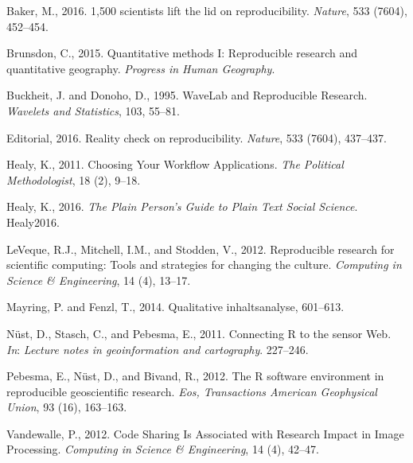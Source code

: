 \documentclass[]{article}
\begin{document}
\hypertarget{refs}{}
\hypertarget{ref-Baker2016}{}
Baker, M., 2016. 1,500 scientists lift the lid on reproducibility.
\emph{Nature}, 533 (7604), 452--454.

\hypertarget{ref-Brunsdon2015}{}
Brunsdon, C., 2015. Quantitative methods I: Reproducible research and
quantitative geography. \emph{Progress in Human Geography}.

\hypertarget{ref-Buckheit1995}{}
Buckheit, J. and Donoho, D., 1995. WaveLab and Reproducible Research.
\emph{Wavelets and Statistics}, 103, 55--81.

\hypertarget{ref-Nature2016}{}
Editorial, 2016. Reality check on reproducibility. \emph{Nature}, 533
(7604), 437--437.

\hypertarget{ref-Healy2011}{}
Healy, K., 2011. Choosing Your Workflow Applications. \emph{The
Political Methodologist}, 18 (2), 9--18.

\hypertarget{ref-Healy2016}{}
Healy, K., 2016. \emph{The Plain Person's Guide to Plain Text Social
Science}. Healy2016.

\hypertarget{ref-Leveque2012}{}
LeVeque, R.J., Mitchell, I.M., and Stodden, V., 2012. Reproducible
research for scientific computing: Tools and strategies for changing the
culture. \emph{Computing in Science \& Engineering}, 14 (4), 13--17.

\hypertarget{ref-Mayring2010}{}
Mayring, P. and Fenzl, T., 2014. Qualitative inhaltsanalyse, 601--613.

\hypertarget{ref-Nuest2011}{}
Nüst, D., Stasch, C., and Pebesma, E., 2011. Connecting R to the sensor
Web. \emph{In}: \emph{Lecture notes in geoinformation and cartography}.
227--246.

\hypertarget{ref-Pebesma2012}{}
Pebesma, E., Nüst, D., and Bivand, R., 2012. The R software environment
in reproducible geoscientific research. \emph{Eos, Transactions American
Geophysical Union}, 93 (16), 163--163.

\hypertarget{ref-Vandewalle2012}{}
Vandewalle, P., 2012. Code Sharing Is Associated with Research Impact in
Image Processing. \emph{Computing in Science \& Engineering}, 14 (4),
42--47.
\end{document}
